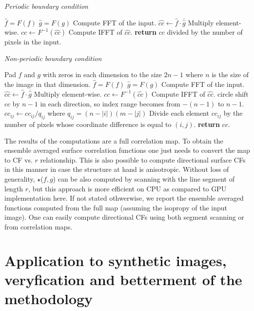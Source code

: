 \documentclass[reprint,amsmath,amssymb,aps,pre,showkeys,showpacs]{revtex4-1}
\begin{document}
\textit{Periodic boundary condition}
\begin{algorithmic}[1]
  \State $\hat{f} = F(f)$
  \State $\hat{g} = F(g)$
  \Comment Compute FFT of the input.
  \State $\hat{cc} \gets \hat{f} \cdot \overline{\hat{g}}$
  \Comment Multiply element-wise.
  \State $cc \gets F^{-1}(\hat{cc})$
  \Comment Compute IFFT of $\hat{cc}$.
  \State \textbf{return} $cc$ divided by the number of pixels in the input.
  \EndProcedure
\end{algorithmic}

\textit{Non-periodic boundary condition}
\begin{algorithmic}[1]
  \State Pad $f$ and $g$ with zeros in each dimension to the size $2n-1$ where
  $n$ is the size of the image in that dimension.
  \State $\hat{f} = F(f)$
  \State $\hat{g} = F(g)$
  \Comment Compute FFT of the input.
  \State $\hat{cc} \gets \hat{f} \cdot \overline{\hat{g}}$
  \Comment Multiply element-wise.
  \State $cc \gets F^{-1}(\hat{cc})$
  \Comment Compute IFFT of $\hat{cc}$.
  \State circle shift $cc$ by $n - 1$ in each direction, so index range becomes
  from $-(n - 1)$ to $n - 1$.
  \State $cc_{ij} \gets cc_{ij} / q_{ij}$ where $q_{ij} = (n - |i|)(m - |j|)$
  \Comment Divide each element $cc_{ij}$ by the number of pixels whose
  coordinate difference is equal to $(i, j)$.
  \State \textbf{return} $cc$.
  \EndProcedure
\end{algorithmic}

The results of the computations are a full correlation map. To obtain the
ensemble averaged surface correlation functions one just needs to convert the
map to CF vs. $r$ relationship. This is also possible to compute directional
surface CFs in this manner in case the structure at hand is anisotropic. Without
loss of generality, $\star$($f, g$) can be also computed by scanning with the
line segment of length $r$, but this approach is more efficient on CPU as
compared to GPU implementation here. If not stated othwerwise, we report the
ensemble averaged functions computed from the full map (assuming the isopropy of
the input image). One can easily compute directional CFs
\cite{jiao2014chawla,EPL1} using both segment scanning or from correlation maps.

\section{Application to synthetic images, veryfication and betterment of the methodology}
\label{sec:results}
\end{document}
